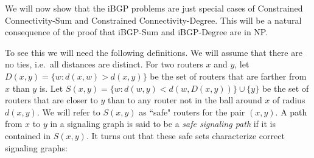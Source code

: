 \documentclass[11pt,letterpaper]{article}
\theoremstyle{definition}
\begin{document}
We will now show that the iBGP problems are just special
cases of {\sc Constrained Connectivity-Sum} and
{\sc Constrained Connectivity-Degree}.  This will be a natural consequence of the proof that {\sc iBGP-Sum} and {\sc iBGP-Degree} are in NP.



  To see this we will need the following definitions.  We
will assume that there are no ties, i.e.\ all distances are distinct.
For two routers $x$ and $y$, let $D(x,y) = \{w : d(x,w) > d(x,y)\}$ be
the set of routers that are farther from $x$ than $y$ is.  Let $S(x,y)
= \{w : d(w,y) < d(w, D(x,y))\} \cup \{y\}$ be the set of
routers that are closer to $y$ than to any router not in the ball
around $x$ of radius $d(x,y)$.  We will refer to $S(x,y)$ as ``safe"
routers for the pair $(x,y)$.
A path from $x$ to $y$ in a signaling graph is said to be a
{\em safe signaling path} if it is contained in $S(x,y)$.
It turns out that these safe sets characterize correct signaling graphs:
\end{document}
